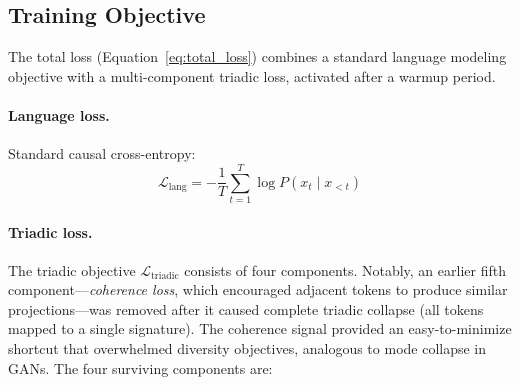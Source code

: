 \documentclass[11pt,a4paper]{article}
\newcommand{\loss}[1]{\mathcal{L}_{\text{#1}}}
\begin{document}
\subsection{Training Objective}
\label{sec:training}

The total loss (Equation~\ref{eq:total_loss}) combines a standard language modeling objective with a multi-component triadic loss, activated after a warmup period.

\paragraph{Language loss.} Standard causal cross-entropy:
\begin{equation}
    \loss{lang} = -\frac{1}{T} \sum_{t=1}^{T} \log P(x_t \mid x_{<t})
\end{equation}

\paragraph{Triadic loss.} The triadic objective $\loss{triadic}$ consists of four components. Notably, an earlier fifth component---\emph{coherence loss}, which encouraged adjacent tokens to produce similar projections---was removed after it caused complete triadic collapse (all tokens mapped to a single signature). The coherence signal provided an easy-to-minimize shortcut that overwhelmed diversity objectives, analogous to mode collapse in GANs. The four surviving components are:
\end{document}
